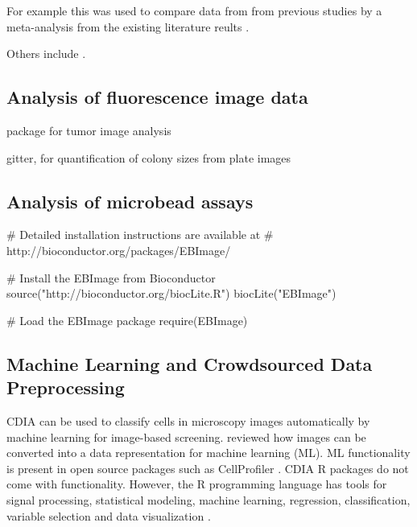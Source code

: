  For example this 
was used to compare data from from previous studies by a meta-analysis from the 
existing literature reults \citep{stocco_coordinate-based_2014}.

Others include  \citep{dunning_beadarray:_2006, frery_introduction_2013}.

\subsection{Analysis of fluorescence image data}

 package \citep{failmezger_crimage:_2012} for tumor image analysis


gitter, for quantification of colony sizes from plate images \citep{wagih_gitter:_2014}


\subsection{Analysis of microbead assays}

\citep{rodiger_highly_2013, rodiger_nucleic_2014}

\begin{example}
# Detailed installation instructions are available at 
# http://bioconductor.org/packages/EBImage/

# Install the EBImage from Bioconductor
source("http://bioconductor.org/biocLite.R")
biocLite("EBImage")

# Load the EBImage package
require(EBImage)


\end{example}

\subsection{Machine Learning and Crowdsourced Data Preprocessing}
CDIA can be used to classify cells in microscopy images automatically by machine 
learning for image-based screening. \citet{sommer_machine_2013} reviewed how 
images can be converted into a data representation for machine learning (ML). ML 
functionality is present in open source packages such as CellProfiler 
\citep{conrad_micropilot:_2011, sommer_machine_2013}. CDIA R packages do not 
come with functionality. However, the R programming language has tools for 
signal processing, statistical modeling, machine learning, regression, 
classification, variable selection and data visualization 
\citep{abbas_comparative_2014, fuchs_clustering_2010, pau_ebimager_2010, 
genuer-poggi-tuleaumalot:2015}.

